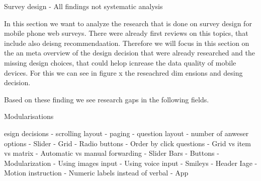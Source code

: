 Survey design
- All findings not systematic analysis

In this section we want to analyze the research that is done on survey design for mobile phone web surveys. There were already first reviews on this topics, that include also deisng recommendaation. Therefore we will focus in this section on the an meta overview of the design decision that were already researched and the missing design choices, that could helop icnrease the data quality of mobile devices. For this we can see in figure x the reseachred dim ensions and desing decision.


Based on these finding we see research gaps in the following fields. 


Modularisations


esign decisions
- scrolling layout
- paging
- question layout
- number of anweser options
- Slider
- Grid
- Radio buttons
- Order by click questions
- Grid vs item vs matrix
- Automatic vs manual forwarding
- Slider Bars
- Buttons
- Modularization
- Using images input
- Using voice input
- Smileys
- Header Iage
- Motion instruction
- Numeric labels instead of verbal
- App 